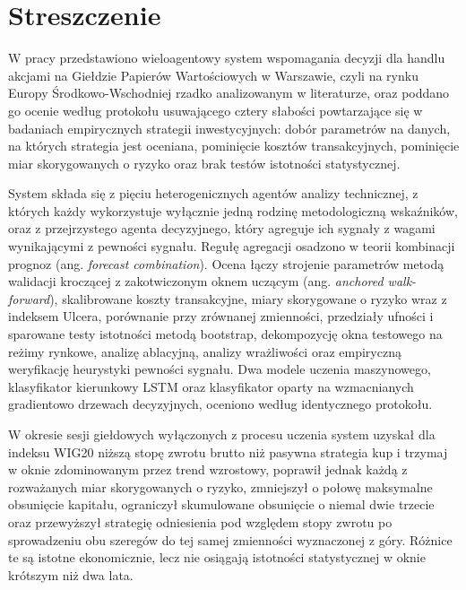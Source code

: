 \chapter*{Streszczenie}

\begin{polish}
\enlargethispage{\baselineskip}
W pracy przedstawiono wieloagentowy system wspomagania decyzji dla handlu akcjami na Giełdzie Papierów Wartościowych w Warszawie, czyli na rynku Europy Środkowo-Wschodniej rzadko analizowanym w literaturze, oraz poddano go ocenie według protokołu usuwającego cztery słabości powtarzające się w badaniach empirycznych strategii inwestycyjnych: dobór parametrów na danych, na których strategia jest oceniana, pominięcie kosztów transakcyjnych, pominięcie miar skorygowanych o ryzyko oraz brak testów istotności statystycznej.

System składa się z pięciu heterogenicznych agentów analizy technicznej, z których każdy wykorzystuje wyłącznie jedną rodzinę metodologiczną wskaźników, oraz z przejrzystego agenta decyzyjnego, który agreguje ich sygnały z wagami wynikającymi z pewności sygnału. Regułę agregacji osadzono w teorii kombinacji prognoz (ang. \emph{forecast combination}). Ocena łączy strojenie parametrów metodą walidacji kroczącej z zakotwiczonym oknem uczącym (ang. \emph{anchored walk-forward}), skalibrowane koszty transakcyjne, miary skorygowane o ryzyko wraz z indeksem Ulcera, porównanie przy zrównanej zmienności, przedziały ufności i sparowane testy istotności metodą bootstrap, dekompozycję okna testowego na reżimy rynkowe, analizę ablacyjną, analizy wrażliwości oraz empiryczną weryfikację heurystyki pewności sygnału. Dwa modele uczenia maszynowego, klasyfikator kierunkowy LSTM oraz klasyfikator oparty na wzmacnianych gradientowo drzewach decyzyjnych, oceniono według identycznego protokołu.

W okresie \OOSDays{} sesji giełdowych wyłączonych z procesu uczenia system uzyskał dla indeksu WIG20 niższą stopę zwrotu brutto niż pasywna strategia kup i trzymaj w oknie zdominowanym przez trend wzrostowy, poprawił jednak każdą z rozważanych miar skorygowanych o ryzyko, zmniejszył o połowę maksymalne obsunięcie kapitału, ograniczył skumulowane obsunięcie o niemal dwie trzecie oraz przewyższył strategię odniesienia pod względem stopy zwrotu po sprowadzeniu obu szeregów do tej samej zmienności wyznaczonej z góry. Różnice te są istotne ekonomicznie, lecz nie osiągają istotności statystycznej w oknie krótszym niż dwa lata.


\end{polish}

